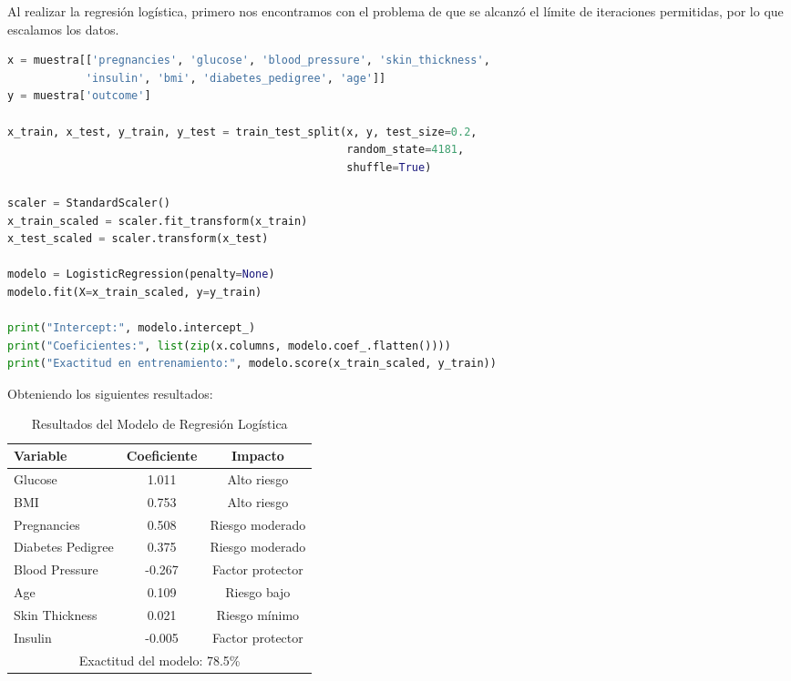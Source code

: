 \documentclass[12pt,a4paper]{article}
\begin{document}
Al realizar la regresión logística, primero nos encontramos con el problema de que se alcanzó el límite de iteraciones permitidas, por lo que escalamos los datos.

\begin{lstlisting}[language=Python, frame=single, basicstyle=\ttfamily\small, breaklines=true]
x = muestra[['pregnancies', 'glucose', 'blood_pressure', 'skin_thickness',
            'insulin', 'bmi', 'diabetes_pedigree', 'age']]
y = muestra['outcome']

x_train, x_test, y_train, y_test = train_test_split(x, y, test_size=0.2, 
                                                    random_state=4181, 
                                                    shuffle=True)

scaler = StandardScaler()
x_train_scaled = scaler.fit_transform(x_train)
x_test_scaled = scaler.transform(x_test)

modelo = LogisticRegression(penalty=None)
modelo.fit(X=x_train_scaled, y=y_train)

print("Intercept:", modelo.intercept_)
print("Coeficientes:", list(zip(x.columns, modelo.coef_.flatten())))
print("Exactitud en entrenamiento:", modelo.score(x_train_scaled, y_train))
\end{lstlisting}

Obteniendo los siguientes resultados:

\vspace{0.3cm}

\begin{table}[H]
\centering
\caption{Resultados del Modelo de Regresión Logística}\label{tab:regresion_resultados}
\begin{tabular}{lcc}
\toprule
\textbf{Variable} & \textbf{Coeficiente} & \textbf{Impacto} \\
\midrule
Glucose & 1.011 & Alto riesgo \\
BMI & 0.753 & Alto riesgo \\
Pregnancies & 0.508 & Riesgo moderado \\
Diabetes Pedigree & 0.375 & Riesgo moderado \\
Blood Pressure & -0.267 & Factor protector \\
Age & 0.109 & Riesgo bajo \\
Skin Thickness & 0.021 & Riesgo mínimo \\
Insulin & -0.005 & Factor protector \\
\midrule
\multicolumn{3}{c}{Exactitud del modelo: 78.5\%} \\
\bottomrule
\end{tabular}
\end{table}
\end{document}
